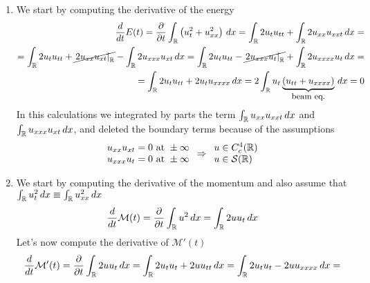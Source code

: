 \begin{enumerate}
    \item We start by computing the derivative of the energy
          \[
              \begin{split}
                  \frac{d}{dt} E(t) = \frac{\partial}{\partial t} \int_{\mathbb{R}} \left( u_t^2 + u_{xx}^2 \right) \, dx = \int_{\mathbb{R}} 2u_t u_{tt} + \int_{\mathbb{R}} 2u_{xx} u_{xxt} \, dx = \\ = \int_{\mathbb{R}} 2u_t u_{tt} + \cancel{\left. 2 u_{xx} u_{xt} \right|_{\mathbb{R}}} - \int_{\mathbb{R}} 2u_{xxx} u_{xt} \, dx = \int_{\mathbb{R}} 2u_t u_{tt} - \cancel{\left. 2 u_{xxx} u_t \right|_{\mathbb{R}}} + \int_{\mathbb{R}} 2 u_{xxxx} u_t \, dx = \\
                  = \int_{\mathbb{R}} 2u_t u_{tt} + 2 u_t u_{xxxx} \, dx = 2 \int_{\mathbb{R}} u_t \underbrace{\left( u_{tt} + u_{xxxx} \right)}_{\text{\small beam eq.}} \, dx = 0
              \end{split}
          \]
          In this calculations we integrated by parts the term \(\int_{\mathbb{R}} u_{xx}
          u_{xxt} \, dx\) and \(\int_{\mathbb{R}} u_{xxx} u_{xt} \, dx\), and deleted the
          boundary terms because of the assumptions
          \[
              \begin{array}{l}
                  u_{xx} u_{xt} = 0 \text{ at } \pm \infty \\
                  u_{xxx} u_t = 0 \text{ at } \pm \infty
              \end{array}
              \Rightarrow \begin{array}{l}
                  u  \in C^4_c(\mathbb{R}) \\
                  u \in \mathcal{S}(\mathbb{R})
              \end{array}
          \]
    \item We start by computing the derivative of the momentum and also assume that
          \(\int_{\mathbb{R}} u_{t}^2 \, dx \equiv \int_{\mathbb{R}} u_{xx}^2 \, dx\)
          \[
              \begin{split}
                  \frac{d}{dt} \mathcal{M}(t) = \frac{\partial}{\partial t} \int_{\mathbb{R}} u^2 \, dx = \int_{\mathbb{R}} 2 u u_t \, dx
              \end{split}
          \]
          Let's now compute the derivative of \(\mathcal{M}'(t)\)
          \[
              \begin{split}
                  \frac{d}{dt} \mathcal{M}'(t) = \frac{\partial}{\partial t} \int_\real 2 u u_t \, dx = \int_\real 2 u_t u_t + 2 u u_{tt} \, dx = \int_\real 2 u_t u_t - 2 u u_{xxxx} \, dx =                              \\

\end{split}\]
\end{enumerate}
